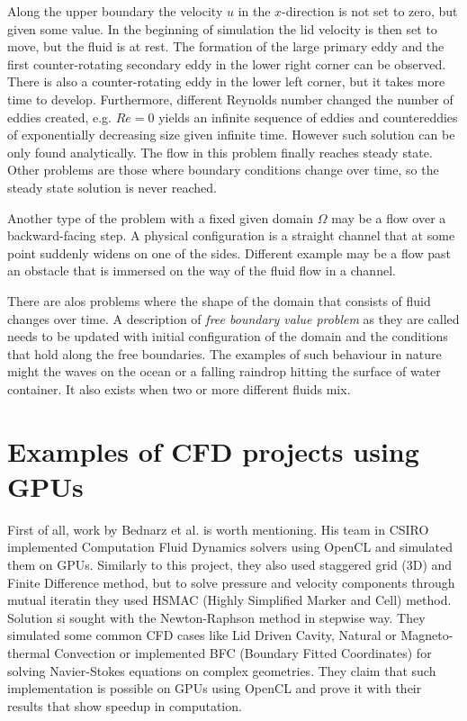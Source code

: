 
Along the upper boundary the velocity $u$ in the $x$-direction is not set to zero, but given some value. In the beginning of simulation the lid velocity is then set to move, but the fluid is at rest. The formation of the large primary eddy and the first counter-rotating secondary eddy in the lower right corner can be observed. There is also a counter-rotating eddy in the lower left corner, but it takes more time to develop. Furthermore, different Reynolds number changed the number of eddies created, e.g. $Re = 0$ yields an infinite sequence of eddies and countereddies of exponentially decreasing size given infinite time. However such solution can be only found analytically. The flow in this problem finally reaches steady state. Other problems are those where boundary conditions change over time, so the steady state solution is never reached.

Another type of the problem with a fixed given domain $\Omega$ may be a flow over a backward-facing step. A physical configuration is a straight channel that at some point suddenly widens on one of the sides. Different example may be a flow past an obstacle that is immersed on the way of the fluid flow in a channel.

There are alos problems where the shape of the domain that consists of fluid changes over time. A description of \emph{free boundary value problem} as they are called needs to be updated with initial configuration of the domain and the conditions that hold along the free boundaries. The examples of such behaviour in nature might the waves on the ocean or a falling raindrop hitting the surface of water container. It also exists when two or more different fluids mix. 

\section{Examples of CFD projects using GPUs}
First of all, work by Bednarz et al. is worth mentioning. His team in CSIRO implemented Computation Fluid Dynamics solvers using OpenCL and simulated them on GPUs. Similarly to this project, they also used staggered grid (3D) and Finite Difference method, but to solve pressure and velocity components through mutual iteratin they used HSMAC (Highly Simplified Marker and Cell) method. Solution si sought with the Newton-Raphson method in stepwise way. They simulated some common CFD cases like Lid Driven Cavity, Natural or Magneto-thermal Convection or implemented BFC (Boundary Fitted Coordinates) for solving Navier-Stokes equations on complex geometries. They claim that such implementation is possible on GPUs using OpenCL and prove it with their results that show speedup in computation. 

